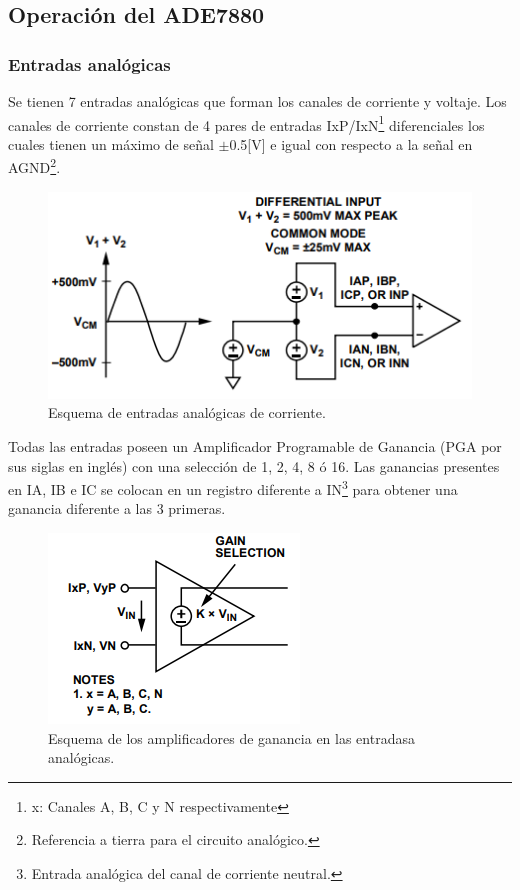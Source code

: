 \documentclass[letterpaper,12pt,oneside]{book}
\begin{document}
			\subsection{Operación del ADE7880}
				\subsubsection{Entradas analógicas}
				Se tienen 7 entradas analógicas que forman los canales de corriente y voltaje. Los canales de corriente constan de 4 pares de entradas IxP/IxN\footnote{x: Canales A, B, C y N respectivamente} diferenciales los cuales tienen un máximo de señal $\pm$0.5[V] e igual con respecto a la señal en AGND\footnote{Referencia a tierra para el circuito analógico.}.

				\begin{figure}[!htpb]
					\centering
					\includegraphics[scale = 1.0]{Material de Consulta/EntAnCrrnt.PNG}
					\caption[Entradas analógicas de corriente]{Esquema de entradas analógicas de corriente.}
					\label{EntCrnt}
				\end{figure}

				Todas las entradas poseen un Amplificador Programable de Ganancia (PGA por sus siglas en inglés) con una selección de 1, 2, 4, 8 ó 16. Las ganancias presentes en IA, IB e IC se colocan en un registro diferente a IN\footnote{Entrada analógica del canal de corriente neutral.} para obtener una ganancia diferente a las 3 primeras.

				\begin{figure}[!htpb]
					\centering
					\includegraphics[scale = 1.0]{Material de Consulta/AmpGan.PNG}
					\caption[Amplificadores de Ganancia]{Esquema de los amplificadores de ganancia en las entradasa analógicas.}
					\label{AmpGan}
				\end{figure}
\end{document}
